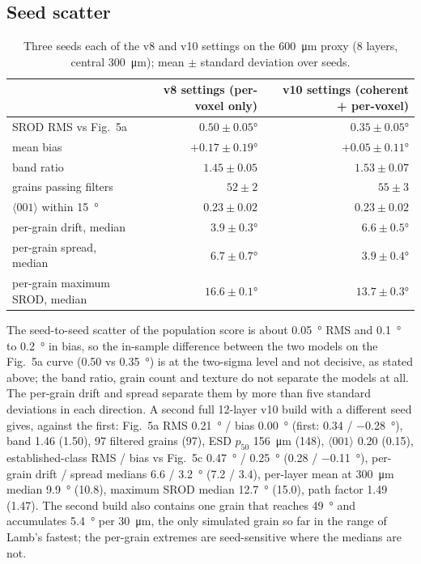 \documentclass[11pt,a4paper]{article}
\newcommand{\dir}[1]{$\langle #1 \rangle$}
\begin{document}
\subsection{Seed scatter}
\begin{table}[htbp]
\centering\small
\caption{Three seeds each of the v8 and v10 settings on the \SI{600}{\micro\metre} proxy (8 layers, central \SI{300}{\micro\metre}); mean $\pm$ standard deviation over seeds.}
\label{tab:seeds}
\begin{tabular}{lrr}
\toprule
 & v8 settings (per-voxel only) & v10 settings (coherent + per-voxel) \\
\midrule
SROD RMS vs Fig.~5a & $0.50 \pm 0.05$\si{\degree} & $0.35 \pm 0.05$\si{\degree} \\
mean bias & $+0.17 \pm 0.19$\si{\degree} & $+0.05 \pm 0.11$\si{\degree} \\
band ratio & $1.45 \pm 0.05$ & $1.53 \pm 0.07$ \\
grains passing filters & $52 \pm 2$ & $55 \pm 3$ \\
\dir{001} within \SI{15}{\degree} & $0.23 \pm 0.02$ & $0.23 \pm 0.02$ \\
per-grain drift, median & $3.9 \pm 0.3$\si{\degree} & $6.6 \pm 0.5$\si{\degree} \\
per-grain spread, median & $6.7 \pm 0.7$\si{\degree} & $3.9 \pm 0.4$\si{\degree} \\
per-grain maximum SROD, median & $16.6 \pm 0.1$\si{\degree} & $13.7 \pm 0.3$\si{\degree} \\
\bottomrule
\end{tabular}
\end{table}

The seed-to-seed scatter of the population score is about \SI{0.05}{\degree} RMS and \SI{0.1}{\degree} to \SI{0.2}{\degree} in bias, so the in-sample difference between the two models on the Fig.~5a curve (0.50 vs \SI{0.35}{\degree}) is at the two-sigma level and not decisive, as stated above; the band ratio, grain count and texture do not separate the models at all. The per-grain drift and spread separate them by more than five standard deviations in each direction. A second full 12-layer v10 build with a different seed gives, against the first: Fig.~5a RMS \SI{0.21}{\degree} / bias \SI{0.00}{\degree} (first: 0.34 / \SI{-0.28}{\degree}), band 1.46 (1.50), 97 filtered grains (97), ESD $p_{50}$ \SI{156}{\micro\metre} (148), \dir{001} 0.20 (0.15), established-class RMS / bias vs Fig.~5c \SI{0.47}{\degree} / \SI{+0.25}{\degree} (0.28 / \SI{-0.11}{\degree}), per-grain drift / spread medians 6.6 / \SI{3.2}{\degree} (7.2 / 3.4), per-layer mean at \SI{300}{\micro\metre} median \SI{9.9}{\degree} (10.8), maximum SROD median \SI{12.7}{\degree} (15.0), path factor 1.49 (1.47). The second build also contains one grain that reaches \SI{49}{\degree} and accumulates \SI{5.4}{\degree} per \SI{30}{\micro\metre}, the only simulated grain so far in the range of Lamb's fastest; the per-grain extremes are seed-sensitive where the medians are not.
\end{document}
